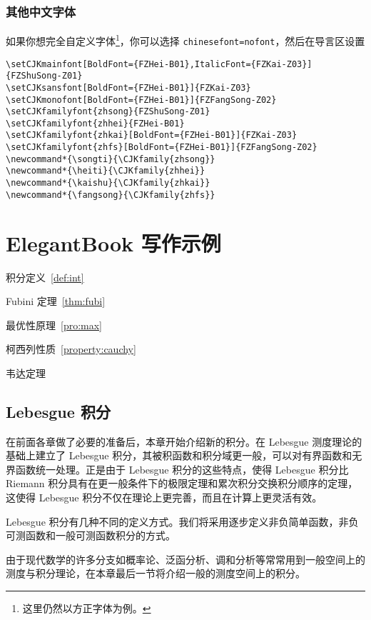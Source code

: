 \documentclass[lang=cn,10pt]{elegantbook}
\begin{document}
\subsection{其他中文字体}
如果你想完全自定义字体\footnote{这里仍然以方正字体为例。}，你可以选择 \lstinline{chinesefont=nofont}，然后在导言区设置
\begin{lstlisting}
\setCJKmainfont[BoldFont={FZHei-B01},ItalicFont={FZKai-Z03}]{FZShuSong-Z01}
\setCJKsansfont[BoldFont={FZHei-B01}]{FZKai-Z03}
\setCJKmonofont[BoldFont={FZHei-B01}]{FZFangSong-Z02}
\setCJKfamilyfont{zhsong}{FZShuSong-Z01}
\setCJKfamilyfont{zhhei}{FZHei-B01}
\setCJKfamilyfont{zhkai}[BoldFont={FZHei-B01}]{FZKai-Z03}
\setCJKfamilyfont{zhfs}[BoldFont={FZHei-B01}]{FZFangSong-Z02}
\newcommand*{\songti}{\CJKfamily{zhsong}}
\newcommand*{\heiti}{\CJKfamily{zhhei}}
\newcommand*{\kaishu}{\CJKfamily{zhkai}}
\newcommand*{\fangsong}{\CJKfamily{zhfs}}
\end{lstlisting}

\chapter{ElegantBook 写作示例}

\begin{introduction}
  \item 积分定义~\ref{def:int}
  \item Fubini 定理~\ref{thm:fubi}
  \item 最优性原理~\ref{pro:max}
  \item 柯西列性质~\ref{property:cauchy}
  \item 韦达定理
\end{introduction}

\section{Lebesgue 积分}
在前面各章做了必要的准备后，本章开始介绍新的积分。在 Lebesgue 测度理论的基础上建立了 Lebesgue 积分，其被积函数和积分域更一般，可以对有界函数和无界函数统一处理。正是由于 Lebesgue 积分的这些特点，使得 Lebesgue 积分比 Riemann 积分具有在更一般条件下的极限定理和累次积分交换积分顺序的定理，这使得 Lebesgue 积分不仅在理论上更完善，而且在计算上更灵活有效。

Lebesgue 积分有几种不同的定义方式。我们将采用逐步定义非负简单函数，非负可测函数和一般可测函数积分的方式。

由于现代数学的许多分支如概率论、泛函分析、调和分析等常常用到一般空间上的测度与积分理论，在本章最后一节将介绍一般的测度空间上的积分。
\end{document}
